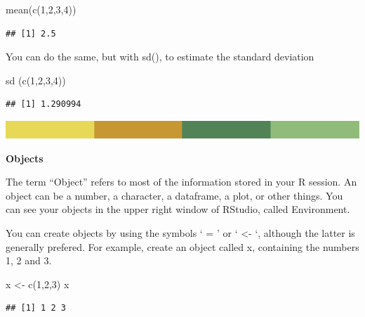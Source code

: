 \documentclass[
]{book}
\newenvironment{Shaded}{\begin{snugshade}}{\end{snugshade}}
\newcommand{\DecValTok}[1]{\textcolor[rgb]{0.00,0.00,0.81}{#1}}
\newcommand{\FunctionTok}[1]{\textcolor[rgb]{0.00,0.00,0.00}{#1}}
\newcommand{\NormalTok}[1]{#1}
\newcommand{\OtherTok}[1]{\textcolor[rgb]{0.56,0.35,0.01}{#1}}
\begin{document}
\begin{Shaded}
\begin{Highlighting}[]
\FunctionTok{mean}\NormalTok{(}\FunctionTok{c}\NormalTok{(}\DecValTok{1}\NormalTok{,}\DecValTok{2}\NormalTok{,}\DecValTok{3}\NormalTok{,}\DecValTok{4}\NormalTok{))}
\end{Highlighting}
\end{Shaded}

\begin{verbatim}
## [1] 2.5
\end{verbatim}

You can do the same, but with sd(), to estimate the standard deviation

\begin{Shaded}
\begin{Highlighting}[]
\FunctionTok{sd}\NormalTok{ (}\FunctionTok{c}\NormalTok{(}\DecValTok{1}\NormalTok{,}\DecValTok{2}\NormalTok{,}\DecValTok{3}\NormalTok{,}\DecValTok{4}\NormalTok{))}
\end{Highlighting}
\end{Shaded}

\begin{verbatim}
## [1] 1.290994
\end{verbatim}

\includegraphics{rsrstrip.png}

\textbf{Objects}

The term ``Object'' refers to most of the information stored in your R session. An object can be a number, a character, a dataframe, a plot, or other things. You can see your objects in the upper right window of RStudio, called Environment.

You can create objects by using the symbols ` = ' or ` \textless- `, although the latter is generally prefered. For example, create an object called x, containing the numbers 1, 2 and 3.

\begin{Shaded}
\begin{Highlighting}[]
\NormalTok{x }\OtherTok{\textless{}{-}} \FunctionTok{c}\NormalTok{(}\DecValTok{1}\NormalTok{,}\DecValTok{2}\NormalTok{,}\DecValTok{3}\NormalTok{)}
\NormalTok{x}
\end{Highlighting}
\end{Shaded}

\begin{verbatim}
## [1] 1 2 3
\end{verbatim}
\end{document}
